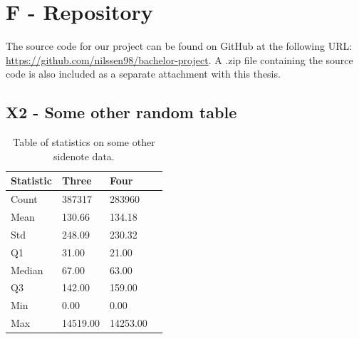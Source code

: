 \renewcommand{\thesection}{\thechapter.\arabic{section}}
\renewcommand{\thesubsection}{\thesection.\arabic{subsection}}

\stopcontents[chapters]


\newpage
\chapter*{F - Repository}

\renewcommand{\thefigure}{F.\arabic{figure}}
\setcounter{figure}{0}
\renewcommand{\thetable}{F.\arabic{table}}
\setcounter{table}{0}

The source code for our project can be found on GitHub at the following URL: \url{https://github.com/nilssen98/bachelor-project}. A .zip file containing the source code is also included as a separate attachment with this thesis.


\iffalse


\renewcommand{\thefigure}{X.\arabic{figure}}
\setcounter{figure}{0}
\renewcommand{\thetable}{X.\arabic{table}}
\setcounter{table}{0}

\newpage
\section*{\large{X2 - Some other random table}}
\vspace*{1cm}

\begin{table}[ht!]
\centering
    \begin{tabular}{ m{4cm} m{2.5cm} m{2.5cm} m{2.5cm} } 
    \toprule
    \toprule
    \textbf{Statistic} & \textbf{Three} & \textbf{Four}  \\
    \midrule
    Count   & 387317    & 283960    \\[1.3ex]
    Mean    & 130.66    & 134.18    \\[1.3ex]
    Std     & 248.09    & 230.32    \\[1.3ex]
    Q1      & 31.00     & 21.00     \\[1.3ex]
    Median  & 67.00     & 63.00     \\[1.3ex]
    Q3      & 142.00    & 159.00    \\[1.3ex]
    Min     & 0.00      & 0.00      \\[1.3ex]
    Max     & 14519.00  & 14253.00  \\[1.3ex]
    \bottomrule
    \bottomrule
    \end{tabular}
\caption[Statistics on something else]{Table of statistics on some other sidenote data.}
\end{table}




